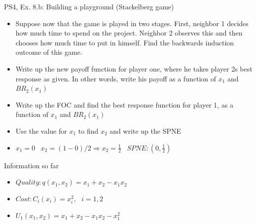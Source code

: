 \begin{frame}{PS4, Ex. 8.b: Building a playground (Stackelberg game)}
    \begin{itemize}
    \item[(b)] Suppose now that the game is played in two stages. First, neighbor 1 decides how much time to spend on the project. Neighbor 2 observes this and then chooses how much time to put in himself. Find the backwards induction outcome of this game.
    \end{itemize}
    \vfill\null
  \begin{multicols}{2}
    \begin{itemize}
      \item[(Step 1)] Write up the new payoff function for player one, where he takes player 2s best response as given. In other words, write his payoff as a function of \begin{math}x_1\end{math} and \begin{math}BR_2(x_1)\end{math}
      \item[(Step 2)] Write up the FOC and find the best response function for player 1, as a function of \begin{math}x_1\end{math} and \begin{math}BR_2(x_1)\end{math}
      \item[(Step 3)] Use the value for $x_1$ to find $x_2$ and write up the SPNE
      \item[(SPNE)]\begin{math} x_1=0 \end{math} \
      \begin{math} x_2=(1-0)/2 \Rightarrow x_2=\frac{1}{2}\end{math} \ \begin{math}SPNE: (0,\frac{1}{2})\end{math}
    \end{itemize}
    \vfill\null \columnbreak
    Information so far
    \begin{itemize}
      \item[1] \begin{math}Quality: q(x_1,x_2)=x_1+x_2-x_1x_2 \end{math}
      \item[2] \begin{math}Cost: C_i(x_i)=x_i^2,\ \ \ i=1,2  \end{math}
      \item[3] \begin{math}U_1(x_1,x_2)=x_1+x_2-x_1x_2-x_1^2 \end{math}

\end{itemize}
\end{multicols}
\end{frame}
